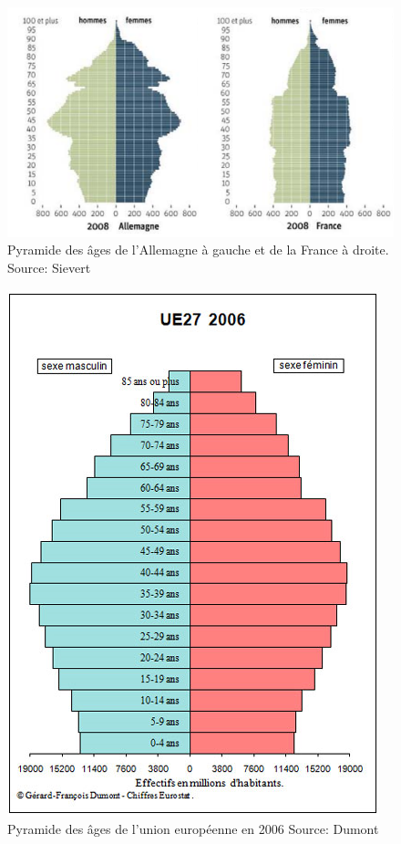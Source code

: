 \begin{figure}[p]
    \begin{center}
        \includegraphics[scale=0.55]{document/pyramide-allemagne-france.png}
        \caption{Pyramide des âges de l'Allemagne à gauche et de la France à droite. Source: Sievert\citep[pp.27]{frde}}
        \label{pyramide-allemagne-france}
    \end{center}
\end{figure}

\begin{figure}[p]
    \begin{center}
        \includegraphics[scale=0.55]{document/eu-2006.png}
        \caption{Pyramide des âges de l'union européenne en 2006 Source: Dumont\citep[pp.3]{pyramide-eu}}
        \label{eu-2006}
    \end{center}
\end{figure}


